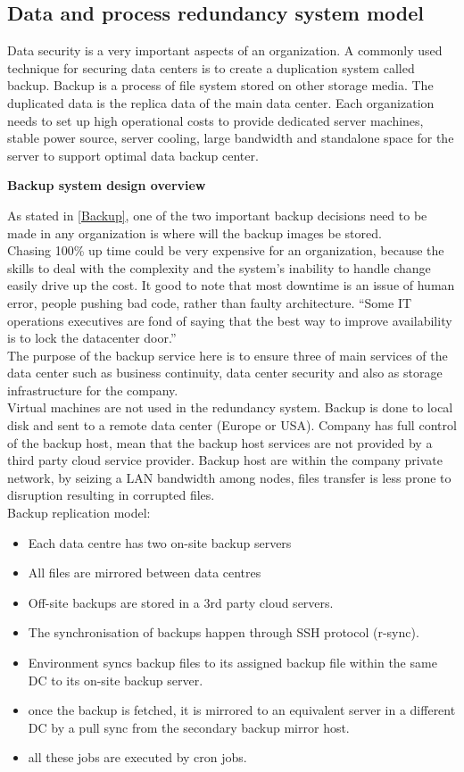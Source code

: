 \documentclass[english]{tktltiki2}
\theoremstyle{definition}
\theoremstyle{remark}
\begin{document}
\subsection{Data and process redundancy system model} 
Data security is a very important aspects of an organization. A commonly used technique for securing data centers is to create a duplication system called backup. Backup is a process of file system stored on other storage media. The duplicated data is the replica data of the main data center.
Each organization needs to set up high operational costs to provide dedicated server machines, stable power source, server cooling, large bandwidth and standalone space for the server to support optimal data backup center.
\begin{flushleft}
\textbf{Backup system design overview}
\end{flushleft}
As stated in \ref{Backup}, one of the two important backup decisions need
to be made in any organization is where will the backup images be stored.\\
Chasing 100\% up time could be very expensive for an organization, because the skills to deal with the complexity and the system’s inability to handle change easily drive up the cost. It good to note that most downtime is an issue of human error, people pushing bad code, rather than faulty architecture. “Some IT operations executives are fond of saying that the best way to improve availability is to lock the datacenter door.”\\
The purpose of the backup service here is to ensure three of main services of the data center such as business continuity, data center security and also as storage infrastructure for the company.\\ 
Virtual machines are not used in the redundancy system. Backup is done to local disk and sent to a remote data center (Europe or USA).
Company has full control of the backup host, mean that the backup host services are not provided by a third party cloud service provider. Backup host are within the company private network, by seizing a LAN bandwidth among nodes, files transfer is less prone to disruption resulting in corrupted files.\\
Backup replication model:\\
\begin{itemize}
     \item Each data centre has two on-site backup servers
     \item All files are mirrored between data centres
     \item Off-site backups are stored in a 3rd party cloud servers.
     \item The synchronisation of backups happen through SSH protocol (r-sync).
     \item Environment syncs backup files to its assigned backup file within the same DC to its on-site backup server.
     \item once the backup is fetched, it is mirrored to an equivalent server in a different DC by a pull sync from the secondary backup mirror host.
     \item all these jobs are executed by cron jobs.
\end{itemize}
    
\end{document}
